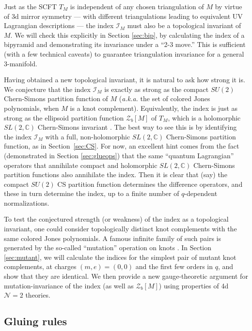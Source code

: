 \documentclass[11pt,letterpaper]{article}
\numberwithin{equation}{section}
\newcommand{\C}{{\mathbb C}}
\newcommand{\CI}{\mathcal{I}}
\newcommand{\CN}{\mathcal{N}}
\newcommand{\CZ}{\mathcal{Z}}
\begin{document}
Just as the SCFT $T_M$ is independent of any chosen triangulation of $M$ by virtue of 3d mirror symmetry --- with different triangulations leading to equivalent UV Lagrangian descriptions --- the index $\CI_M$ must also be a topological invariant of~$M$. We will check this explicitly in Section \ref{sec:bip}, by calculating the index of a bipyramid and demonstrating its invariance under a ``2-3 move.'' This is sufficient (with a few technical caveats)
to guarantee triangulation invariance for a general 3-manifold.

Having obtained a new topological invariant, it is natural to ask how strong it is. We conjecture that the index $\CI_M$ is exactly as strong as the compact $SU(2)$ Chern-Simons partition function of $M$ (\emph{a.k.a.}\! the set of colored Jones polynomials, when $M$ is a knot complement). Equivalently, the index is just as strong as the ellipsoid partition function $\CZ_b[M]$ of $T_M$, which is a holomorphic $SL(2,\C)$ Chern-Simons invariant \cite{DGH, DGG}. The best way to see this is by identifying the index $\CI_M$ with a full, non-holomorphic $SL(2,\C)$ Chern-Simons partition function, as in Section~\ref{sec:CS}. For now, an excellent hint comes from the fact (demonstrated in Section \ref{sec:glueops}) that the same ``quantum Lagrangian'' operators that annihilate compact \cite{Gar-Le, garoufalidis-2004} and holomorphic \cite{gukov-2003, DGLZ, Dimofte-QRS} $SL(2,\C)$ Chern-Simons partition functions also annihilate the index. Then it is clear that (say) the compact $SU(2)$ CS partition function determines the difference operators, and these in turn determine the index, up to a finite number of $q$-dependent normalizations.

To test the conjectured strength (or weakness) of the index as a topological invariant, one could consider topologically distinct knot complements with the same colored Jones polynomials. A famous infinite family of such pairs is generated by the so-called ``mutation'' operation on knots \cite{Conway-mutation, MortonTraczyk}. In Section \ref{sec:mutant}, we will calculate the indices for the simplest pair of mutant knot complements, at charges $(m,e)=(0,0)$ and the first few orders in $q$, and show that they are identical. We then provide a new gauge-theoretic argument for mutation-invariance of the index (as well as $\CZ_b[M]$) using properties of 4d $\CN=2$ theories.

\subsection{Gluing rules}
\label{sec:rules}
\end{document}
